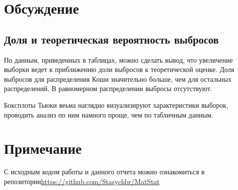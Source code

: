 \documentclass[a4paper,12pt]{article} %
\begin{document}
\section{Обсуждение}
\subsection{Доля и теоретическая вероятность выбросов}
По данным, приведенных в таблицах, можно сделать вывод, что увеличение выборки ведет к приближению доли выбросов к теоретической оценке. Доля выбросов для распределения Коши значительно больше, чем для остальных распределений. В равномерном распределении выбросы отсутствуют.

Боксплоты Тьюки веьма наглядно визуализируют характеристики выборок, проводить анализ по ним намного проще, чем по табличным данным.
\section*{Примечание}
С исходным кодом работы и данного отчета можно ознакомиться в репозитории\;\url{https://github.com/Stasychbr/MatStat}
\end{document}
